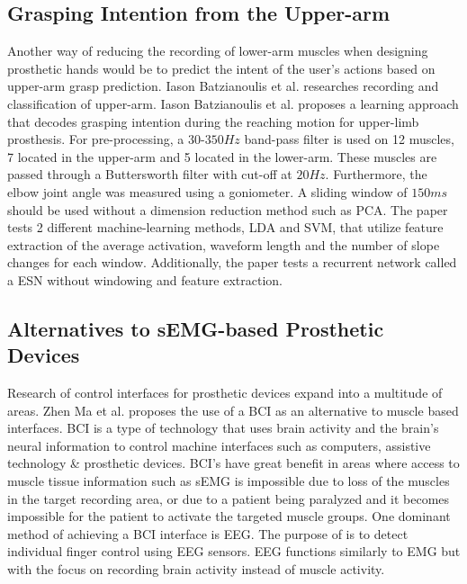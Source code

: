 \documentclass[../main.tex]{subfiles}
\begin{document}
\subsection{Grasping Intention from the Upper-arm}

Another way of reducing the recording of lower-arm muscles when designing prosthetic hands would be to predict the intent of the user's actions based on upper-arm grasp prediction.
Iason Batzianoulis et al. \cite{Batzianoulis2018} researches recording and classification of upper-arm.
Iason Batzianoulis et al. proposes a learning approach that decodes grasping intention during the reaching motion for upper-limb prosthesis.
For pre-processing, a $30$-$350Hz$ band-pass filter is used on 12 muscles, 7 located in the upper-arm and 5 located in the lower-arm.
These muscles are passed through a Buttersworth filter with cut-off at $20Hz$.
Furthermore, the elbow joint angle was measured using a \gls{goniometer}.
A sliding window of $150ms$ should be used without a dimension reduction method such as \gls{PCA}.
The paper tests 2 different machine-learning methods, \gls{LDA} and \gls{SVM}, that utilize feature extraction of the average activation, waveform length and the number of slope changes for each window.
Additionally, the paper tests a recurrent network called a \gls{ESN} without windowing and feature extraction.

\subsection{Alternatives to sEMG-based Prosthetic Devices}

Research of control interfaces for prosthetic devices expand into a multitude of areas.
Zhen Ma et al. \cite{fnins2016} proposes the use of a \gls{BCI} as an alternative to muscle based interfaces.
\gls{BCI} is a type of technology that uses brain activity and the brain's neural information to control machine interfaces such as computers, assistive technology \& prosthetic devices.
\gls{BCI}'s have great benefit in areas where access to muscle tissue information such as \gls{sEMG} is impossible due to loss of the muscles in the target recording area, or due to a patient being paralyzed and it becomes impossible for the patient to activate the targeted muscle groups.
One dominant method of achieving a \gls{BCI} interface is \gls{EEG}.
The purpose of \cite{fnins2016} is to detect individual finger control using \gls{EEG} sensors. 
\gls{EEG} functions similarly to \gls{EMG} but with the focus on recording brain activity instead of muscle activity.
\end{document}
